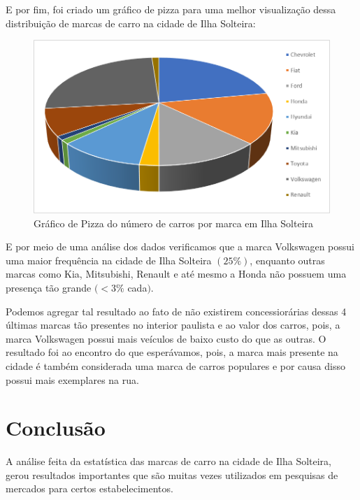 \documentclass[
	12pt,				%
	oneside,			%
	a4paper,			%
	english,			%
	french,				%
	spanish,			%
	brazil,				%
	]{abntex2}
\begin{document}
E por fim, foi criado um gráfico de pizza para uma melhor visualização dessa distribuição de marcas de carro na cidade de Ilha Solteira:

\begin{figure}[H]
\begin{center}
\caption{Gráfico de Pizza do número de carros por marca em Ilha Solteira}

\includegraphics[scale=0.8]{grafico8.jpg}  

\end{center}
\end{figure}

E por meio de uma análise dos dados verificamos que a marca Volkswagen possui uma maior frequência na cidade de Ilha Solteira $(25\%)$, enquanto outras marcas como Kia, Mitsubishi, Renault e até mesmo a Honda não possuem uma presença tão grande $(<3\%$ cada$)$. 

Podemos agregar tal resultado ao fato de não existirem concessiorárias dessas 4 últimas marcas tão presentes no interior paulista e ao valor dos carros, pois, a marca Volkswagen possui mais veículos de baixo custo do que as outras. O resultado foi ao encontro do que esperávamos, pois, a marca mais presente na cidade é também considerada uma marca de carros populares e por causa disso possui mais exemplares na rua.

\newpage
\section[Conclusão]{Conclusão}
\pagestyle{fancy}

A análise feita da estatística das marcas de carro na cidade de Ilha Solteira, gerou resultados importantes que são muitas vezes utilizados em pesquisas de mercados para certos estabelecimentos. 
\end{document}
